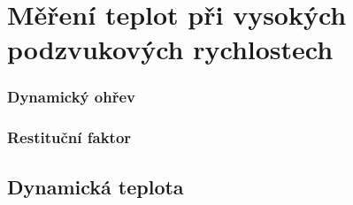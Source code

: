 \section{Měření teplot při vysokých podzvukových rychlostech} \label{sec:mereni-teplot}
    \subsubsection{Dynamický ohřev}
    \subsubsection{Restituční faktor}
    
    \subsection{Dynamická teplota}